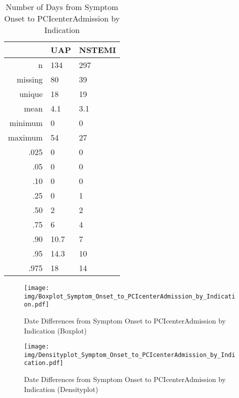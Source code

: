 \documentclass[presentation,xcolor=pdftex,dvipsnames,table,11pt]{beamer}
\begin{document}
\begin{tiny}
\begin{table}[ht]
\centering
\begin{tabular}{rll}
  \toprule
 & UAP & NSTEMI \\ 
  \midrule
n & 134 & 297 \\ 
  missing & 80 & 39 \\ 
  unique & 18 & 19 \\ 
  mean & 4.1 & 3.1 \\ 
  minimum & 0 & 0 \\ 
  maximum & 54 & 27 \\ 
  .025 & 0 & 0 \\ 
  .05 & 0 & 0 \\ 
  .10 & 0 & 0 \\ 
  .25 & 0 & 1 \\ 
  .50 & 2 & 2 \\ 
  .75 & 6 & 4 \\ 
  .90 & 10.7 & 7 \\ 
  .95 & 14.3 & 10 \\ 
  .975 & 18 & 14 \\ 
   \bottomrule
\end{tabular}
\caption{Number of Days from Symptom Onset to PCIcenterAdmission by Indication} 
\end{table}
\begin{frame}
\begin{figure}
  \centering
  \caption{Date Differences from Symptom Onset to PCIcenterAdmission by Indication (Boxplot)}
  \label{Boxplot: Date Differences from Symptom Onset to PCIcenterAdmission by Indication}
\texttt{[image: img/Boxplot\_Symptom\_Onset\_to\_PCIcenterAdmission\_by\_Indication.pdf]}\end{figure}
\end{frame}


\begin{frame}
\begin{figure}
  \centering
  \caption{Date Differences from Symptom Onset to PCIcenterAdmission by Indication (Densityplot)}
  \label{Density: Date Differences from Symptom Onset to PCIcenterAdmission by Indication}
\texttt{[image: img/Densityplot\_Symptom\_Onset\_to\_PCIcenterAdmission\_by\_Indication.pdf]}\end{figure}
\end{frame}




\end{tiny}
\end{document}
